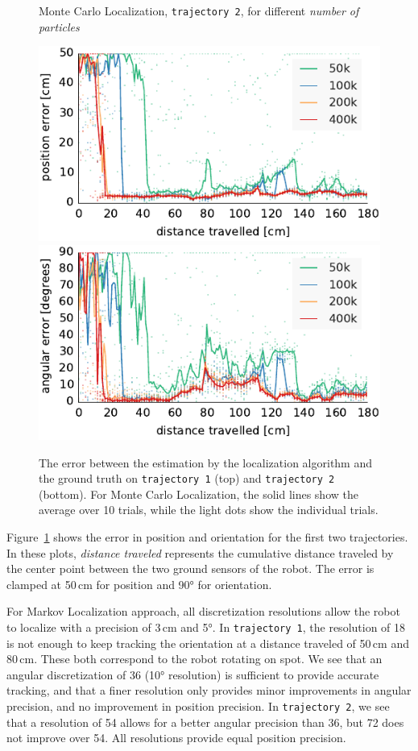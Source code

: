 \documentclass[letterpaper, 10pt, conference]{ieeeconf}
\newcommand{\Fig}[1]{Figure~\ref{fig:#1}}
\begin{document}
\begin{figure}
\begin{center}
Monte Carlo Localization, \texttt{trajectory~2}, for different \emph{number of particles}
\end{center}
\includegraphics{mcl-whole_random_2-xy}\hfill
\includegraphics{mcl-whole_random_2-theta}

\caption{The error between the estimation by the localization algorithm and the ground truth on \texttt{trajectory~1} (top) and \texttt{trajectory~2} (bottom).
For Monte Carlo Localization, the solid lines show the average over 10 trials, while the light dots show the individual trials.}
\label{fig:whole-runs-random12}
\end{figure}

\Fig{whole-runs-random12} shows the error in position and orientation for the first two trajectories.
In these plots, \emph{distance traveled} represents the cumulative distance traveled by the center point between the two ground sensors of the robot.
The error is clamped at 50\,cm for position and 90° for orientation.

For Markov Localization approach, all discretization resolutions allow the robot to localize with a precision of 3\,cm and 5°.
In \texttt{trajectory~1}, the resolution of 18 is not enough to keep tracking the orientation at a distance traveled of 50\,cm and 80\,cm.
These both correspond to the robot rotating on spot.
We see that an angular discretization of 36 (10° resolution) is sufficient to provide accurate tracking, and that a finer resolution only provides minor improvements in angular precision, and no improvement in position precision.
In \texttt{trajectory~2}, we see that a resolution of 54 allows for a better angular precision than 36, but 72 does not improve over 54.
All resolutions provide equal position precision.
\end{document}
